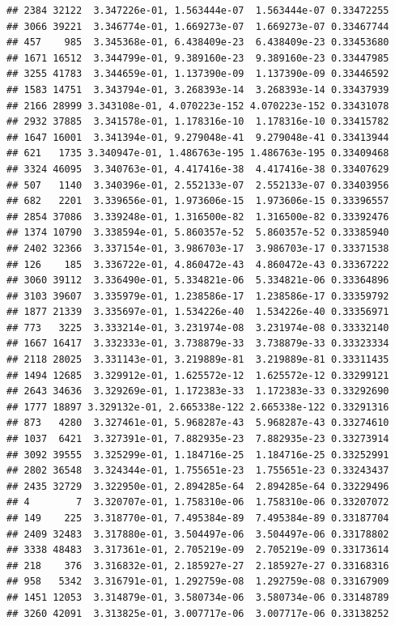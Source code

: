 \documentclass[
]{article}
\begin{document}
\begin{verbatim}
## 2384 32122  3.347226e-01, 1.563444e-07  1.563444e-07 0.33472255
## 3066 39221  3.346774e-01, 1.669273e-07  1.669273e-07 0.33467744
## 457    985  3.345368e-01, 6.438409e-23  6.438409e-23 0.33453680
## 1671 16512  3.344799e-01, 9.389160e-23  9.389160e-23 0.33447985
## 3255 41783  3.344659e-01, 1.137390e-09  1.137390e-09 0.33446592
## 1583 14751  3.343794e-01, 3.268393e-14  3.268393e-14 0.33437939
## 2166 28999 3.343108e-01, 4.070223e-152 4.070223e-152 0.33431078
## 2932 37885  3.341578e-01, 1.178316e-10  1.178316e-10 0.33415782
## 1647 16001  3.341394e-01, 9.279048e-41  9.279048e-41 0.33413944
## 621   1735 3.340947e-01, 1.486763e-195 1.486763e-195 0.33409468
## 3324 46095  3.340763e-01, 4.417416e-38  4.417416e-38 0.33407629
## 507   1140  3.340396e-01, 2.552133e-07  2.552133e-07 0.33403956
## 682   2201  3.339656e-01, 1.973606e-15  1.973606e-15 0.33396557
## 2854 37086  3.339248e-01, 1.316500e-82  1.316500e-82 0.33392476
## 1374 10790  3.338594e-01, 5.860357e-52  5.860357e-52 0.33385940
## 2402 32366  3.337154e-01, 3.986703e-17  3.986703e-17 0.33371538
## 126    185  3.336722e-01, 4.860472e-43  4.860472e-43 0.33367222
## 3060 39112  3.336490e-01, 5.334821e-06  5.334821e-06 0.33364896
## 3103 39607  3.335979e-01, 1.238586e-17  1.238586e-17 0.33359792
## 1877 21339  3.335697e-01, 1.534226e-40  1.534226e-40 0.33356971
## 773   3225  3.333214e-01, 3.231974e-08  3.231974e-08 0.33332140
## 1667 16417  3.332333e-01, 3.738879e-33  3.738879e-33 0.33323334
## 2118 28025  3.331143e-01, 3.219889e-81  3.219889e-81 0.33311435
## 1494 12685  3.329912e-01, 1.625572e-12  1.625572e-12 0.33299121
## 2643 34636  3.329269e-01, 1.172383e-33  1.172383e-33 0.33292690
## 1777 18897 3.329132e-01, 2.665338e-122 2.665338e-122 0.33291316
## 873   4280  3.327461e-01, 5.968287e-43  5.968287e-43 0.33274610
## 1037  6421  3.327391e-01, 7.882935e-23  7.882935e-23 0.33273914
## 3092 39555  3.325299e-01, 1.184716e-25  1.184716e-25 0.33252991
## 2802 36548  3.324344e-01, 1.755651e-23  1.755651e-23 0.33243437
## 2435 32729  3.322950e-01, 2.894285e-64  2.894285e-64 0.33229496
## 4        7  3.320707e-01, 1.758310e-06  1.758310e-06 0.33207072
## 149    225  3.318770e-01, 7.495384e-89  7.495384e-89 0.33187704
## 2409 32483  3.317880e-01, 3.504497e-06  3.504497e-06 0.33178802
## 3338 48483  3.317361e-01, 2.705219e-09  2.705219e-09 0.33173614
## 218    376  3.316832e-01, 2.185927e-27  2.185927e-27 0.33168316
## 958   5342  3.316791e-01, 1.292759e-08  1.292759e-08 0.33167909
## 1451 12053  3.314879e-01, 3.580734e-06  3.580734e-06 0.33148789
## 3260 42091  3.313825e-01, 3.007717e-06  3.007717e-06 0.33138252

\end{verbatim}
\end{document}
